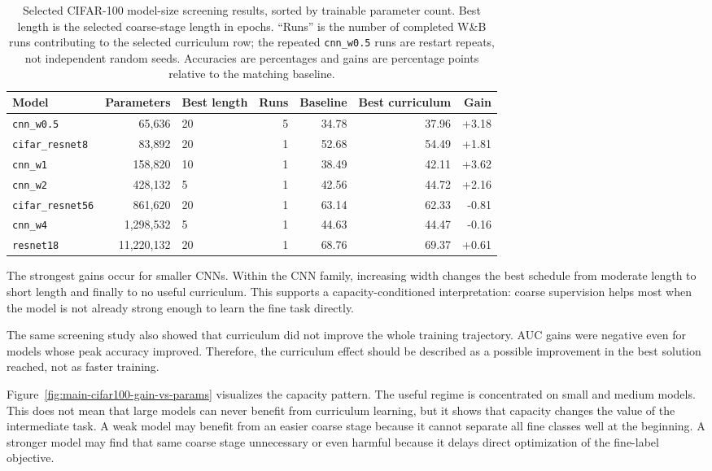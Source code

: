 \documentclass[english,master,a4paper,oneside]{ppfcmthesis}
\begin{document}
\begin{table}[htbp]
\centering
\scriptsize
\begin{tabular}{lrlrrrr}
\toprule
Model & Parameters & Best length & Runs & Baseline & Best curriculum & Gain \\
\midrule
\texttt{cnn\_w0.5} & 65,636 & 20 & 5 & 34.78 & 37.96 & +3.18 \\
\texttt{cifar\_resnet8} & 83,892 & 20 & 1 & 52.68 & 54.49 & +1.81 \\
\texttt{cnn\_w1} & 158,820 & 10 & 1 & 38.49 & 42.11 & +3.62 \\
\texttt{cnn\_w2} & 428,132 & 5 & 1 & 42.56 & 44.72 & +2.16 \\
\texttt{cifar\_resnet56} & 861,620 & 20 & 1 & 63.14 & 62.33 & -0.81 \\
\texttt{cnn\_w4} & 1,298,532 & 5 & 1 & 44.63 & 44.47 & -0.16 \\
\texttt{resnet18} & 11,220,132 & 20 & 1 & 68.76 & 69.37 & +0.61 \\
\bottomrule
\end{tabular}
\caption{Selected CIFAR-100 model-size screening results, sorted by trainable
parameter count. Best length is the selected coarse-stage length in epochs.
``Runs'' is the number of completed W\&B runs contributing to the selected
curriculum row; the repeated \texttt{cnn\_w0.5} runs are restart repeats, not
independent random seeds. Accuracies are percentages and gains are percentage
points relative to the matching baseline.}
\label{tab:main-cifar100-capacity}
\end{table}

The strongest gains occur for smaller CNNs. Within the CNN family, increasing
width changes the best schedule from moderate length to short length and finally
to no useful curriculum. This supports a capacity-conditioned interpretation:
coarse supervision helps most when the model is not already strong enough to
learn the fine task directly.

The same screening study also showed that curriculum did not improve the whole
training trajectory. AUC gains were negative even for models whose peak accuracy
improved. Therefore, the curriculum effect should be described as a possible
improvement in the best solution reached, not as faster training.

Figure~\ref{fig:main-cifar100-gain-vs-params} visualizes the capacity pattern.
The useful regime is concentrated on small and medium models. This does not mean
that large models can never benefit from curriculum learning, but it shows that
capacity changes the value of the intermediate task. A weak model may benefit
from an easier coarse stage because it cannot separate all fine classes well at
the beginning. A stronger model may find that same coarse stage unnecessary or
even harmful because it delays direct optimization of the fine-label objective.
\end{document}
